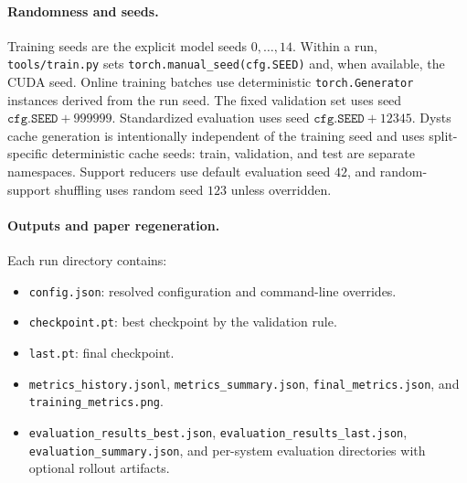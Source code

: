 \paragraph{Randomness and seeds.}
Training seeds are the explicit model seeds \(0,\ldots,14\). Within a run,
\texttt{tools/train.py} sets \texttt{torch.manual\_seed(cfg.SEED)} and, when
available, the CUDA seed. Online training batches use deterministic
\texttt{torch.Generator} instances derived from the run seed. The fixed
validation set uses seed \(\texttt{cfg.SEED}+999999\). Standardized evaluation
uses seed \(\texttt{cfg.SEED}+12345\). Dysts cache generation is intentionally
independent of the training seed and uses split-specific deterministic cache
seeds: train, validation, and test are separate namespaces. Support reducers use
default evaluation seed \(42\), and random-support shuffling uses random seed
\(123\) unless overridden.

\paragraph{Outputs and paper regeneration.}
Each run directory contains:
\begin{itemize}
  \item \texttt{config.json}: resolved configuration and command-line overrides.
  \item \texttt{checkpoint.pt}: best checkpoint by the validation rule.
  \item \texttt{last.pt}: final checkpoint.
  \item \texttt{metrics\_history.jsonl}, \texttt{metrics\_summary.json},
  \texttt{final\_metrics.json}, and \texttt{training\_metrics.png}.
  \item \texttt{evaluation\_results\_best.json},
  \texttt{evaluation\_results\_last.json}, \texttt{evaluation\_summary.json},
  and per-system evaluation directories with optional rollout artifacts.
\end{itemize}


